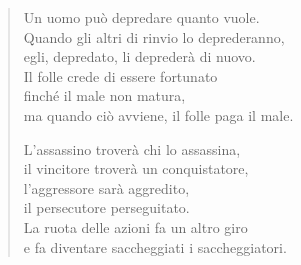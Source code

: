 \begin{quote}
Un uomo può depredare quanto vuole. \\
Quando gli altri di rinvio lo deprederanno, \\
egli, depredato, li deprederà di nuovo. \\
Il folle crede di essere fortunato \\
finché il male non matura, \\
ma quando ciò avviene, il folle paga il male.


L’assassino troverà chi lo assassina, \\
il vincitore troverà un conquistatore, \\
l’aggressore sarà aggredito, \\
il persecutore perseguitato. \\
La ruota delle azioni fa un altro giro \\
e fa diventare saccheggiati i saccheggiatori.
\end{quote}



